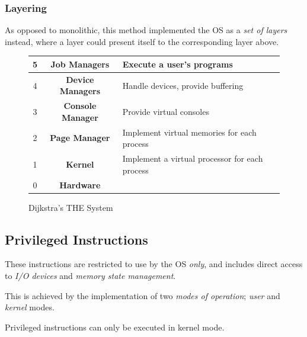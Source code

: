 \documentclass{article}
\begin{document}
\subsubsection{Layering}

As opposed to monolithic, this method implemented the OS as a \textit{set of layers} instead, where a layer could present itself to the corresponding layer above.

\begin{figure}[H]
  \centering
  \begin{center}
  \begin{tabular}{|c|c|l|}
    \hline
    5 & \textbf{Job Managers} & Execute a user's programs\\
    \hline
    4 & \textbf{Device Managers} & Handle devices, provide buffering\\
    \hline
    3 & \textbf{Console Manager} & Provide virtual consoles\\
    \hline
    2 & \textbf{Page Manager} & Implement virtual memories for each process\\
    \hline
    1 & \textbf{Kernel} & Implement a virtual processor for each process\\
    \hline
    0 & \textbf{Hardware} & \\
    \hline
  \end{tabular}
\end{center}
\caption{Dijkstra's THE System}
\end{figure}

\filbreak
\subsection{Privileged Instructions}

These instructions are restricted to use by the OS \textit{only}, and includes direct access to \textit{I/O devices} and \textit{memory state management}.

This is achieved by the implementation of two \textit{modes of operation}; \textit{user} and \textit{kernel} modes.

Privileged instructions can only be executed in kernel mode.
\end{document}
